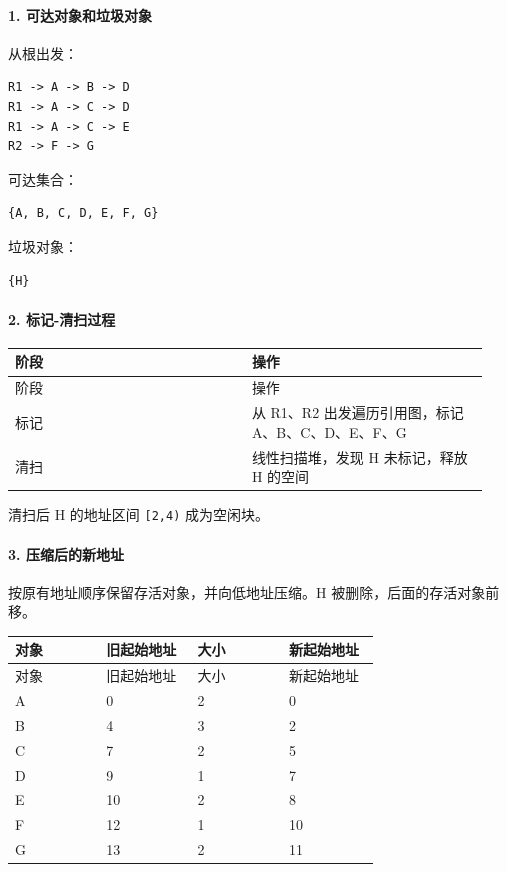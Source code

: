 \documentclass[UTF8]{ctexart}
\begin{document}
\paragraph*{1. 可达对象和垃圾对象}

从根出发：

\begin{Verbatim}[fontsize=\small,breaklines=true]
R1 -> A -> B -> D
R1 -> A -> C -> D
R1 -> A -> C -> E
R2 -> F -> G
\end{Verbatim}

可达集合：

\begin{Verbatim}[fontsize=\small,breaklines=true]
{A, B, C, D, E, F, G}
\end{Verbatim}

垃圾对象：

\begin{Verbatim}[fontsize=\small,breaklines=true]
{H}
\end{Verbatim}

\paragraph*{2. 标记-清扫过程}

\begin{longtable}{|p{0.47\linewidth}|p{0.47\linewidth}|}
\hline
阶段 & 操作 \\
\hline
\endfirsthead
阶段 & 操作 \\
\hline
\endhead
标记 & 从 R1、R2 出发遍历引用图，标记 A、B、C、D、E、F、G \\
\hline
清扫 & 线性扫描堆，发现 H 未标记，释放 H 的空间 \\
\hline
\end{longtable}

清扫后 H 的地址区间 \texttt{[2,4)} 成为空闲块。

\paragraph*{3. 压缩后的新地址}

按原有地址顺序保留存活对象，并向低地址压缩。H 被删除，后面的存活对象前移。

\begin{longtable}{|p{0.23\linewidth}|p{0.23\linewidth}|p{0.23\linewidth}|p{0.23\linewidth}|}
\hline
对象 & 旧起始地址 & 大小 & 新起始地址 \\
\hline
\endfirsthead
对象 & 旧起始地址 & 大小 & 新起始地址 \\
\hline
\endhead
A & 0 & 2 & 0 \\
\hline
B & 4 & 3 & 2 \\
\hline
C & 7 & 2 & 5 \\
\hline
D & 9 & 1 & 7 \\
\hline
E & 10 & 2 & 8 \\
\hline
F & 12 & 1 & 10 \\
\hline
G & 13 & 2 & 11 \\
\hline
\end{longtable}
\end{document}
